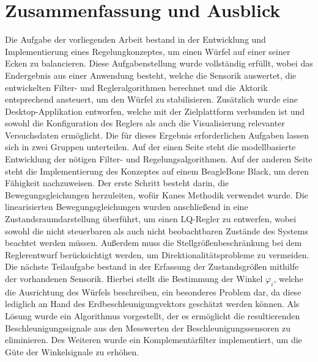 \chapter{Zusammenfassung und Ausblick}
Die Aufgabe der vorliegenden Arbeit bestand in der Entwicklung und Implementierung eines Regelungkonzeptes, um einen Würfel auf einer seiner Ecken zu balancieren. Diese Aufgabenstellung wurde vollständig erfüllt, wobei das Endergebnis aus einer Anwendung besteht, welche die Sensorik auswertet, die entwickelten Filter- und Regleralgorithmen berechnet und die Aktorik entsprechend ansteuert, um den Würfel zu stabilisieren. Zusätzlich wurde eine Desktop-Applikation entworfen, welche mit der Zielplattform verbunden ist und sowohl die Konfiguration des Reglers als auch die Visualisierung relevanter Versuchsdaten ermöglicht. Die für dieses Ergebnis erforderlichen Aufgaben lassen sich in zwei Gruppen unterteilen. Auf der einen Seite steht die modellbasierte Entwicklung der nötigen Filter- und Regelungsalgorithmen. Auf der anderen Seite steht die Implementierung des Konzeptes auf einem BeagleBone Black, um deren Fähigkeit nachzuweisen.
Der erste Schritt besteht darin, die Bewegungsgleichungen herzuleiten, wofür Kanes Methodik verwendet wurde. Die linearisierten Bewegungsgleichungen wurden anschließend in eine Zustandsraumdarstellung überführt, um einen LQ-Regler zu entwerfen, wobei sowohl die nicht steuerbaren als auch nicht beobachtbaren Zustände des Systems beachtet werden müssen. Außerdem muss die Stellgrößenbeschränkung bei dem Reglerentwurf berücksichtigt werden, um Direktionalitätsprobleme zu vermeiden.
Die nächste Teilaufgabe bestand in der Erfassung der Zustandsgrößen mithilfe der vorhandenen Sensorik. Hierbei stellt die Bestimmung der Winkel $\varphi_i$, welche die Ausrichtung des Würfels beschreiben, ein besonderes Problem dar, da diese lediglich an Hand des Erdbeschleunigungvektors geschätzt werden können. Als Lösung wurde ein Algorithmus vorgestellt, der es ermöglicht die resultierenden Beschleunigungssignale aus den Messwerten der Beschleunigungssensoren zu eliminieren. Des Weiteren wurde ein Komplementärfilter implementiert, um die Güte der Winkelsignale zu erhöhen.

